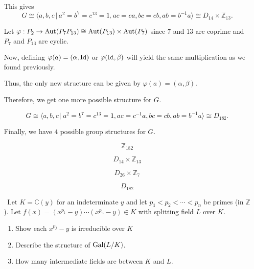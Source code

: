 \documentclass[12pt]{AlgebraQual}
\begin{document}
\begin{solution}
This gives $$G\cong\langle a,b,c\,|\,a^2=b^7=c^{13}=1,ac=ca,bc=cb,ab=b^{-1}a\rangle\cong D_{14}\times\mathbb{Z}_{13}.$$

 Let $\varphi:P_2\to\text{Aut}(P_7P_{13})\cong\text{Aut}(P_{13})\times\text{Aut}(P_7)$ since $7$ and $13$ are coprime and $P_7$ and $P_{13}$ are cyclic.

Now, defining $\varphi(a)=(\alpha,\text{Id})$ or $\varphi(\text{Id},\beta)$ will yield the same multiplication as we found previously.

Thus, the only new structure can be given by $\varphi(a)=(\alpha,\beta)$.

Therefore, we get one more possible structure for $G.$

$$G\cong\langle a,b,c\,|\,a^2=b^7=c^{13}=1,ac=c^{-1}a,bc=cb,ab=b^{-1}a\rangle\cong D_{182}.$$

Finally, we have $4$ possible group structures for $G.$

\begin{center}
    \begin{framed}
    $$\mathbb{Z}_{182}$$

    $$D_{14}\times\mathbb{Z}_{13}$$

    $$D_{26}\times\mathbb{Z}_7$$

    $$D_{182}$$
    \end{framed}
\end{center}
\end{solution}
\newpage


\begin{problem} $\,$
Let $K=\mathbb{C}(y)$ for an indeterminate $y$ and let $p_1<p_2<\cdots<p_n$ be primes (in $\mathbb{Z}$). Let $f(x)=(x^{p_1}-y)\cdots(x^{p_n}-y)\in K$ with splitting field $L$ over $K$.
\begin{enumerate}[label=(\alph*)]
    \item Show each $x^{p_j}-y$ is irreducible over $K$
    \item Describe the structure of $\text{Gal}(L/K)$.
    \item How many intermediate fields are between $K$ and $L$.
\end{enumerate}
\end{problem}
\end{document}
